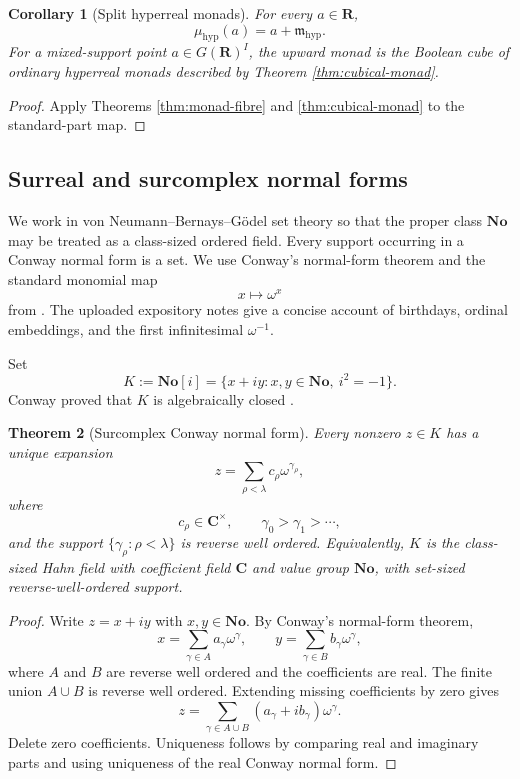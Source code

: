\documentclass[11pt]{amsart}
\numberwithin{equation}{section}
\newtheorem{theorem}{Theorem}[section]
\newtheorem{corollary}[theorem]{Corollary}
\theoremstyle{definition}
\newcommand{\R}{\mathbf R}
\newcommand{\C}{\mathbf C}
\newcommand{\No}{\mathbf{No}}
\begin{document}
\begin{corollary}[Split hyperreal monads]\label{cor:hyperreal-monads}
For every $a\in\R$,
\[
\mu_{\mathrm{hyp}}(a)
=
a+\mathfrak m_{\mathrm{hyp}}.
\]
For a mixed-support point $a\in G(\R)^I$, the upward monad is the Boolean cube of ordinary hyperreal monads described by Theorem \ref{thm:cubical-monad}.
\end{corollary}

\begin{proof}
Apply Theorems \ref{thm:monad-fibre} and \ref{thm:cubical-monad} to the standard-part map.
\end{proof}

\subsection{Surreal and surcomplex normal forms}

We work in von Neumann--Bernays--G\"odel set theory so that the proper class $\No$ may be treated as a class-sized ordered field.  Every support occurring in a Conway normal form is a set.  We use Conway's normal-form theorem and the standard monomial map
\[
x\longmapsto\omega^x
\]
from \cite{Conway}.  The uploaded expository notes \cite{Simons} give a concise account of birthdays, ordinal embeddings, and the first infinitesimal $\omega^{-1}$.

Set
\[
K:=\No[i]
=
\{x+iy:x,y\in\No,\ i^2=-1\}.
\]
Conway proved that $K$ is algebraically closed \cite{Conway}.

\begin{theorem}[Surcomplex Conway normal form]\label{thm:surcomplex-normal-form}
Every nonzero $z\in K$ has a unique expansion
\[
z=
\sum_{\rho<\lambda}
 c_\rho\omega^{\gamma_\rho},
\]
where
\[
c_\rho\in\C^\times,
\qquad
\gamma_0>\gamma_1>\cdots,
\]
and the support $\{\gamma_\rho:\rho<\lambda\}$ is reverse well ordered.  Equivalently, $K$ is the class-sized Hahn field with coefficient field $\C$ and value group $\No$, with set-sized reverse-well-ordered support.
\end{theorem}

\begin{proof}
Write $z=x+iy$ with $x,y\in\No$.  By Conway's normal-form theorem,
\[
x=\sum_{\gamma\in A}a_\gamma\omega^\gamma,
\qquad
 y=\sum_{\gamma\in B}b_\gamma\omega^\gamma,
\]
where $A$ and $B$ are reverse well ordered and the coefficients are real.  The finite union $A\cup B$ is reverse well ordered.  Extending missing coefficients by zero gives
\[
z=
\sum_{\gamma\in A\cup B}
(a_\gamma+ib_\gamma)\omega^\gamma.
\]
Delete zero coefficients.  Uniqueness follows by comparing real and imaginary parts and using uniqueness of the real Conway normal form.
\end{proof}
\end{document}

